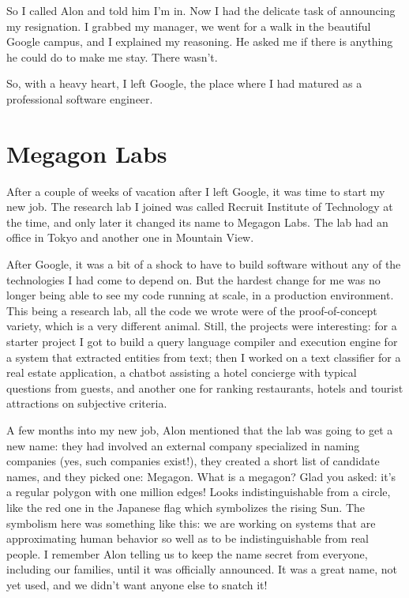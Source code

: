 \documentclass[12pt]{book}
\begin{document}
So I called Alon and told him I'm in. Now I had the delicate task of
announcing my resignation. I grabbed my manager, we went for a walk in
the beautiful Google campus, and I explained my reasoning. He asked me
if there is anything he could do to make me stay. There wasn't.

So, with a heavy heart, I left Google, the place where I had matured as
a professional software engineer.


\section{Megagon Labs}

After a couple of weeks of vacation after I left Google, it was time to
start my new job. The research lab I joined was called Recruit Institute
of Technology at the time, and only later it changed its name to Megagon
Labs. The lab had an office in Tokyo and another one in Mountain View.

After Google, it was a bit of a shock to have to build software without
any of the technologies I had come to depend on. But the hardest change
for me was no longer being able to see my code running at scale, in a
production environment. This being a research lab, all the code we wrote
were of the proof-of-concept variety, which is a very different animal.
Still, the projects were interesting: for a starter project I got to
build a query language compiler and execution engine for a system that
extracted entities from text; then I worked on a text classifier for a
real estate application, a chatbot assisting a hotel concierge with
typical questions from guests, and another one for ranking restaurants,
hotels and tourist attractions on subjective criteria.

A few months into my new job, Alon mentioned that the lab was going to
get a new name: they had involved an external company specialized in
naming companies (yes, such companies exist!), they created a short list
of candidate names, and they picked one: Megagon. What is a megagon?
Glad you asked: it's a regular polygon with one million edges! Looks
indistinguishable from a circle, like the red one in the Japanese flag
which symbolizes the rising Sun. The symbolism here was something like
this: we are working on systems that are approximating human behavior so
well as to be indistinguishable from real people. I remember Alon
telling us to keep the name secret from everyone, including our
families, until it was officially announced. It was a great name, not
yet used, and we didn't want anyone else to snatch it!
\end{document}
